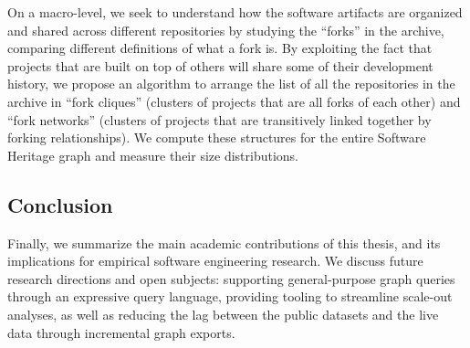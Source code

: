 On a macro-level, we seek to understand how the software artifacts are
organized and shared across different repositories by studying the ``forks'' in
the archive, comparing different definitions of what a fork is. By exploiting
the fact that projects that are built on top of others will share some of their
development history, we propose an algorithm to arrange the list of all the
repositories in the archive in ``fork cliques'' (clusters of projects that are
all forks of each other) and ``fork networks'' (clusters of projects that are
transitively linked together by forking relationships). We compute these
structures for the entire Software Heritage graph and measure their size
distributions.

\subsection*{Conclusion}

Finally, we summarize the main academic contributions of this thesis, and its
implications for empirical software engineering research. We discuss future
research directions and open subjects: supporting general-purpose graph queries
through an expressive query language, providing tooling to streamline scale-out
analyses, as well as reducing the lag between the public datasets and the live
data through incremental graph exports.
